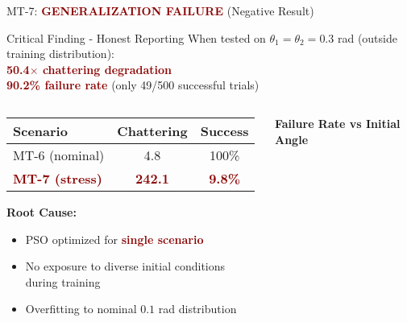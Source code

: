 \documentclass[10pt,aspectratio=169]{beamer}
\newcommand{\emphred}[1]{\textcolor{darkred}{\textbf{#1}}}
\begin{document}
\begin{frame}{MT-7: \emphred{GENERALIZATION FAILURE} (Negative Result)}
\begin{alertblock}{Critical Finding - Honest Reporting}
\centering
When tested on $\theta_1 = \theta_2 = 0.3$ rad (outside training distribution): \\
\Large
\emphred{50.4$\times$ chattering degradation} \\
\normalsize
\emphred{90.2\% failure rate} (only 49/500 successful trials)
\end{alertblock}

\vspace{0.3cm}
\begin{columns}
\begin{column}{0.5\textwidth}
\begin{table}
\small
\begin{tabular}{lcc}
\toprule
\textbf{Scenario} & \textbf{Chattering} & \textbf{Success} \\
\midrule
MT-6 (nominal) & 4.8 & 100\% \\
\emphred{MT-7 (stress)} & \emphred{242.1} & \emphred{9.8\%} \\
\bottomrule
\end{tabular}
\end{table}

\vspace{0.3cm}
\textbf{Root Cause:}
\begin{itemize}
    \item PSO optimized for \emphred{single scenario}
    \item No exposure to diverse initial conditions during training
    \item Overfitting to nominal $0.1$ rad distribution
\end{itemize}
\end{column}
\begin{column}{0.5\textwidth}
\begin{center}
\textbf{Failure Rate vs Initial Angle}
\end{center}
\end{column}
\end{columns}
\end{frame}
\end{document}
